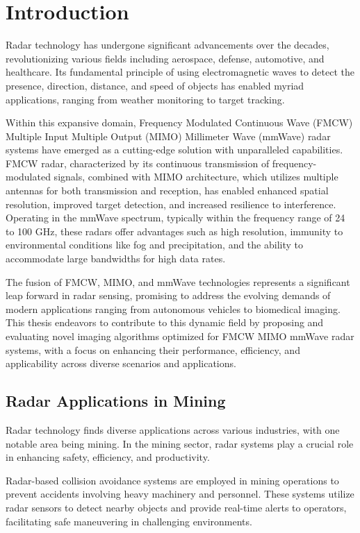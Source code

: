 \chapter{Introduction}

Radar technology has undergone significant advancements over the decades,
revolutionizing various fields including aerospace, defense, automotive, and healthcare.
Its fundamental principle of using electromagnetic waves to detect the presence,
direction, distance, and speed of objects has enabled myriad applications, ranging from weather monitoring to target tracking.

Within this expansive domain, Frequency Modulated Continuous Wave (FMCW)
Multiple Input Multiple Output (MIMO) Millimeter Wave (mmWave) radar systems have emerged
as a cutting-edge solution with unparalleled capabilities.
FMCW radar, characterized by its continuous transmission of frequency-modulated signals,
combined with MIMO architecture, which utilizes multiple antennas for both transmission and reception,
has enabled enhanced spatial resolution, improved target detection, and increased resilience to interference.
Operating in the mmWave spectrum, typically within the frequency range of 24 to 100 GHz,
these radars offer advantages such as high resolution, immunity to environmental conditions
like fog and precipitation, and the ability to accommodate large bandwidths for high data rates.

The fusion of FMCW, MIMO, and mmWave technologies represents a significant leap forward in radar sensing,
promising to address the evolving demands of modern applications ranging from autonomous vehicles to biomedical imaging.
This thesis endeavors to contribute to this dynamic field by proposing and evaluating
novel imaging algorithms optimized for FMCW MIMO mmWave radar systems, with a focus on
enhancing their performance, efficiency, and applicability across diverse scenarios and applications. \\

\section{Radar Applications in Mining}
Radar technology finds diverse applications across various industries, with one notable area being mining.
In the mining sector, radar systems play a crucial role in enhancing safety, efficiency, and productivity.

Radar-based collision avoidance systems are employed in mining operations to prevent accidents involving heavy machinery and personnel.
These systems utilize radar sensors to detect nearby objects and provide real-time alerts to operators,
facilitating safe maneuvering in challenging environments.

